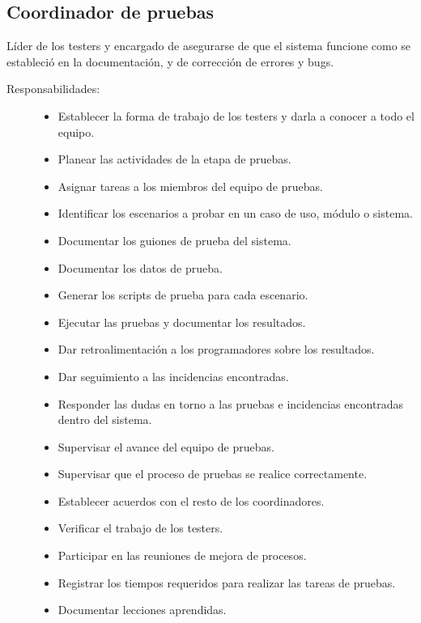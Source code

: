 \subsection{Coordinador de pruebas}
	Líder de los testers y encargado de asegurarse de que el sistema funcione como se estableció en la documentación, y de corrección de errores y bugs.
\begin{description}
	\item[Responsabilidades:] \cdtEmpty 	
    \begin{itemize}
    	\item Establecer la forma de trabajo de los testers y darla a conocer a todo el equipo.
    	\item Planear las actividades de la etapa de pruebas.
    	\item Asignar tareas a los miembros del equipo de pruebas.
    	\item Identificar los escenarios a probar en un caso de uso, módulo o sistema.
    	\item Documentar los guiones de prueba del sistema.
    	\item Documentar los datos de prueba.
    	\item Generar los scripts de prueba para cada escenario.
    	\item Ejecutar las pruebas y documentar los resultados.
    	\item Dar retroalimentación a los programadores sobre los resultados.
    	\item Dar seguimiento a las incidencias encontradas.
    	\item Responder las dudas en torno a las pruebas e incidencias encontradas dentro del sistema.
    	\item Supervisar el avance del equipo de pruebas.
    	\item Supervisar que el proceso de pruebas se realice correctamente.
    	\item Establecer acuerdos con el resto de los coordinadores.
    	\item Verificar el trabajo de los testers.
    	\item Participar en las reuniones de mejora de procesos.
    	\item Registrar los tiempos requeridos para realizar las tareas de pruebas.
    	\item Documentar lecciones aprendidas.
    \end{itemize}
\end{description}

